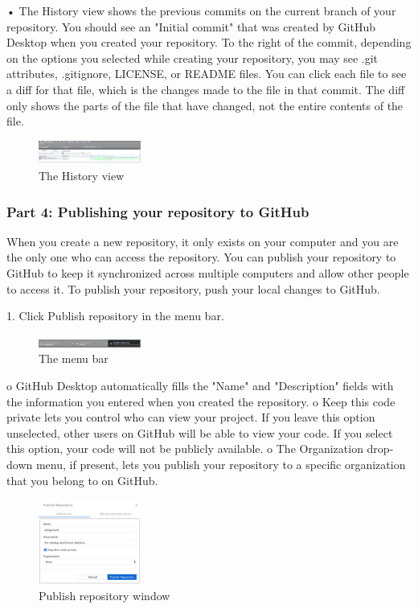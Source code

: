 •	The History view shows the previous commits on the current branch of your repository. You should see an "Initial commit" that was created by GitHub Desktop when you created your repository. To the right of the commit, depending on the options you selected while creating your repository, you may see .git attributes, .gitignore, LICENSE, or README files. You can click each file to see a diff for that file, which is the changes made to the file in that commit. The diff only shows the parts of the file that have changed, not the entire contents of the file. 
\begin{figure}[ht]
    \centering
    \includegraphics[width=0.3\textwidth]{figures/The History view.png}
    \caption{The History view}
\end{figure}



\subsubsection{Part 4: Publishing your repository to GitHub}

When you create a new repository, it only exists on your computer and you are the only one who can access the repository. You can publish your repository to GitHub to keep it synchronized across multiple computers and allow other people to access it. To publish your repository, push your local changes to GitHub.

1.	Click Publish repository in the menu bar.
\begin{figure}[ht]
    \centering
    \includegraphics[width=0.3\textwidth]{figures/The menu bar.png}
    \caption{The menu bar}
\end{figure}
 
o	GitHub Desktop automatically fills the "Name" and "Description" fields with the information you entered when you created the repository.
o	Keep this code private lets you control who can view your project. If you leave this option unselected, other users on GitHub will be able to view your code. If you select this option, your code will not be publicly available.
o	The Organization drop-down menu, if present, lets you publish your repository to a specific organization that you belong to on GitHub.
\begin{figure}[ht]
    \centering
    \includegraphics[width=0.3\textwidth]{figures/Publish repository window.png}
    \caption{Publish repository window}
\end{figure}


